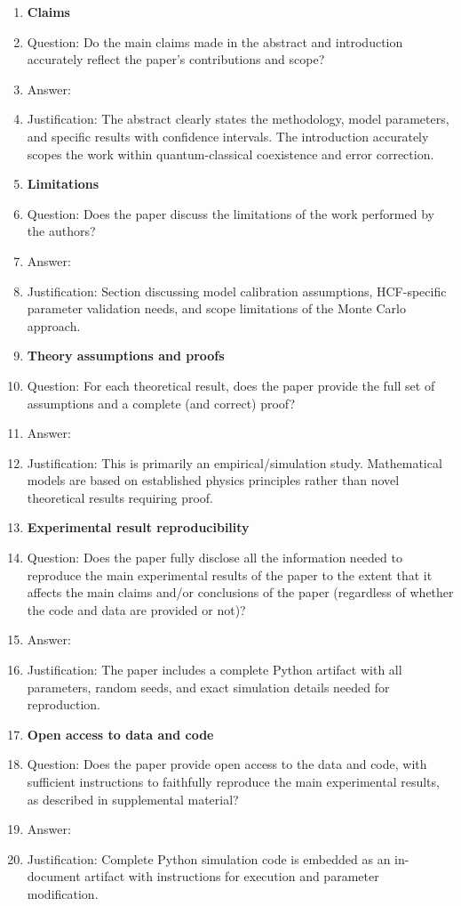 \documentclass{article}
\begin{document}
\begin{enumerate}

\item {\bf Claims}
    \item[] Question: Do the main claims made in the abstract and introduction accurately reflect the paper's contributions and scope?
    \item[] Answer: \answerYes{}
    \item[] Justification: The abstract clearly states the methodology, model parameters, and specific results with confidence intervals. The introduction accurately scopes the work within quantum-classical coexistence and error correction.

\item {\bf Limitations}
    \item[] Question: Does the paper discuss the limitations of the work performed by the authors?
    \item[] Answer: \answerYes{}
    \item[] Justification: Section discussing model calibration assumptions, HCF-specific parameter validation needs, and scope limitations of the Monte Carlo approach.

\item {\bf Theory assumptions and proofs}
    \item[] Question: For each theoretical result, does the paper provide the full set of assumptions and a complete (and correct) proof?
    \item[] Answer: \answerNA{}
    \item[] Justification: This is primarily an empirical/simulation study. Mathematical models are based on established physics principles rather than novel theoretical results requiring proof.

\item {\bf Experimental result reproducibility}
    \item[] Question: Does the paper fully disclose all the information needed to reproduce the main experimental results of the paper to the extent that it affects the main claims and/or conclusions of the paper (regardless of whether the code and data are provided or not)?
    \item[] Answer: \answerYes{}
    \item[] Justification: The paper includes a complete Python artifact with all parameters, random seeds, and exact simulation details needed for reproduction.

\item {\bf Open access to data and code}
    \item[] Question: Does the paper provide open access to the data and code, with sufficient instructions to faithfully reproduce the main experimental results, as described in supplemental material?
    \item[] Answer: \answerYes{}
    \item[] Justification: Complete Python simulation code is embedded as an in-document artifact with instructions for execution and parameter modification.


\end{enumerate}
\end{document}
